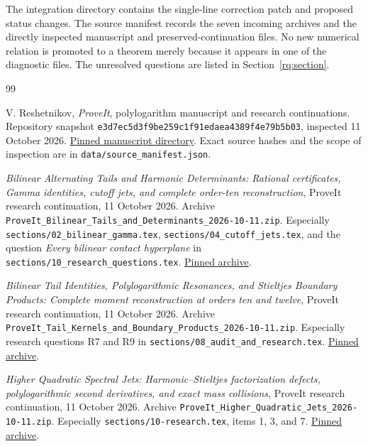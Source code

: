 \documentclass[11pt,letterpaper]{article}
\numberwithin{equation}{section}
\theoremstyle{definition}
\theoremstyle{remark}
\newcommand{\src}[1]{\nolinkurl{#1}}
\newcommand{\pin}{\texttt{e3d7ec5d3f9be259c1f91edaea4389f4e79b5b03}}
\begin{document}
The integration directory contains the single-line correction patch and
proposed status changes. The source manifest records the seven incoming
archives and the directly inspected manuscript and preserved-continuation
files. No new numerical relation is promoted to a theorem merely because
it appears in one of the diagnostic files. The unresolved questions are
listed in Section~\ref{rq:section}.



\begin{thebibliography}{99}
\raggedright

V. Reshetnikov, \emph{ProveIt}, polylogarithm manuscript and research
continuations. Repository snapshot \pin, inspected 11 October 2026.
\href{https://github.com/VladimirReshetnikov/ProveIt/tree/e3d7ec5d3f9be259c1f91edaea4389f4e79b5b03/Analysis/Polylogarithms/docs/manuscript}{Pinned manuscript directory}.
Exact source hashes and the scope of inspection are in
\src{data/source_manifest.json}.

\emph{Bilinear Alternating Tails and Harmonic Determinants:
Rational certificates, Gamma identities, cutoff jets, and complete
order-ten reconstruction}, ProveIt research continuation, 11 October 2026.
Archive \src{ProveIt_Bilinear_Tails_and_Determinants_2026-10-11.zip}.
Especially \src{sections/02_bilinear_gamma.tex},
\src{sections/04_cutoff_jets.tex}, and the question
\emph{Every bilinear contact hyperplane} in
\src{sections/10_research_questions.tex}.
\href{https://github.com/VladimirReshetnikov/ProveIt/blob/e3d7ec5d3f9be259c1f91edaea4389f4e79b5b03/docs/incoming/ProveIt_Bilinear_Tails_and_Determinants_2026-10-11.zip}{Pinned archive}.

\emph{Bilinear Tail Identities, Polylogarithmic Resonances, and Stieltjes
Boundary Products: Complete moment reconstruction at orders ten and twelve},
ProveIt research continuation, 11 October 2026.
Archive \src{ProveIt_Tail_Kernels_and_Boundary_Products_2026-10-11.zip}.
Especially research questions R7 and R9 in
\src{sections/08_audit_and_research.tex}.
\href{https://github.com/VladimirReshetnikov/ProveIt/blob/e3d7ec5d3f9be259c1f91edaea4389f4e79b5b03/docs/incoming/ProveIt_Tail_Kernels_and_Boundary_Products_2026-10-11.zip}{Pinned archive}.

\emph{Higher Quadratic Spectral Jets: Harmonic--Stieltjes factorization
defects, polylogarithmic second derivatives, and exact mass collisions},
ProveIt research continuation, 11 October 2026.
Archive \src{ProveIt_Higher_Quadratic_Jets_2026-10-11.zip}.
Especially \src{sections/10-research.tex}, items 1, 3, and 7.
\href{https://github.com/VladimirReshetnikov/ProveIt/blob/e3d7ec5d3f9be259c1f91edaea4389f4e79b5b03/docs/incoming/ProveIt_Higher_Quadratic_Jets_2026-10-11.zip}{Pinned archive}.


\end{thebibliography}
\end{document}
